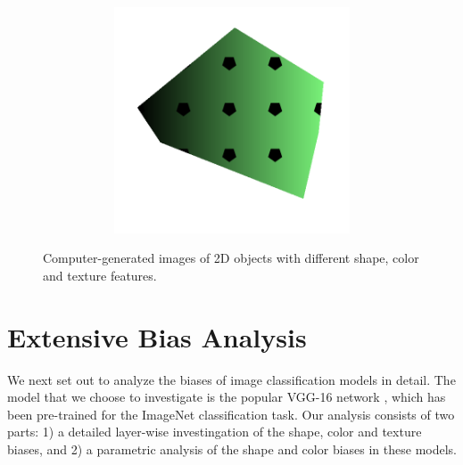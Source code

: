 \begin{figure}[h!]
\begin{center}
\begin{subfigure}[b]{0.3\textwidth}
\begin{center}
\begin{subfigure}[b]{0.4\textwidth}
                \end{subfigure}
                \begin{subfigure}[b]{0.4\textwidth}
                    \includegraphics[width=\linewidth]{figures/generated_objects/img0005.png}
                \end{subfigure}
            \end{center}
        \end{subfigure}
    \end{center}
    \caption{Computer-generated images of 2D objects with different shape, color and texture features.}
    \label{fig:generated_images}
\end{figure}

\section{Extensive Bias Analysis}
We next set out to analyze the biases of image classification models in detail. The model that
we choose to investigate is the popular VGG-16 network \cite{}, which has been pre-trained for
the ImageNet classification task.
Our analysis consists of two parts: 1) a detailed layer-wise investingation of the shape, color and
texture biases, and 2) a parametric analysis of the shape and color biases in these models.

